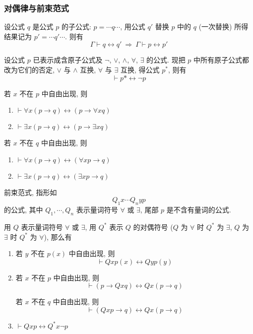 \documentclass[
    color=black,
    device=normal,
    lang=cn
]{elegantnote}
\begin{document}
\subsubsection{对偶律与前束范式}
\begin{theorem}[子公式的等价可替换性]
    设公式 $q$ 是公式 $p$ 的子公式: $p = \cdots q \cdots$, 用公式 $q'$ 替换 $p$ 中的 $q$ (一次替换) 所得结果记为 $p' = \cdots q'\cdots$. 则有
    $$
        \Gamma\vdash q\leftrightarrow q' \ \Rightarrow\  \Gamma\vdash p\leftrightarrow p'
    $$
\end{theorem}
\begin{theorem}[对偶律]
    设公式 $p$ 已表示成含原子公式及 $\lnot$, $\lor$, $\land$, $\forall$, $\exists$ 的公式. 现把 $p$ 中所有原子公式都改为它们的否定, $\lor$ 与 $\land$ 互换, $\forall$ 与 $\exists$ 互换, 得公式 $p^*$, 则有
    $$
        \vdash p*\leftrightarrow \lnot p
    $$
\end{theorem}
\begin{proposition}
    若 $x$ 不在 $p$ 中自由出现, 则
    \begin{enumerate}[label = $\arabic*^\circ$]
        \item $\vdash \forall x (p\to q)\leftrightarrow (p\to \forall x q)$
        \item $\vdash \exists x (p\to q)\leftrightarrow (p\to \exists x q)$
    \end{enumerate}
    若 $x$ 不在 $q$ 中自由出现, 则
    \begin{enumerate}[label = $\arabic*^\circ$]
        \item $\vdash \forall x (p\to q)\leftrightarrow (\forall x p\to q)$
        \item $\vdash \exists x (p\to q)\leftrightarrow (\exists x p\to q)$
    \end{enumerate}
\end{proposition}
\begin{definition}[前束范式]
    前束范式, 指形如
    $$
        Q_1 x\cdots Q_n y p
    $$
    的公式, 其中 $Q_1, \cdots, Q_n$ 表示量词符号 $\forall$ 或 $\exists$, 尾部 $p$ 是不含有量词的公式.
\end{definition}
\begin{proposition}
    用 $Q$ 表示量词符号 $\forall$ 或 $\exists$, 用 $Q^*$ 表示 $Q$ 的对偶符号 ($Q$ 为 $\forall$ 时 $Q^*$ 为 $\exists$, $Q$ 为 $\exists$ 时 $Q^*$ 为 $\forall$), 那么有
    \begin{enumerate}[label = $\arabic*^\circ$]
        \item 若 $y$ 不在 $p(x)$ 中自由出现, 则 $$\vdash Qxp(x)\leftrightarrow Qyp(y)$$
        \item 若 $x$ 不在 $p$ 中自由出现, 则 $$\vdash (p\to Qxq)\leftrightarrow Qx(p\to q)$$

              若 $x$ 不在 $q$ 中自由出现, 则 $$\vdash (Qxp\to q)\leftrightarrow Qx(p\to q)$$
        \item $\vdash Qxp\leftrightarrow Q^*x\lnot p$
    \end{enumerate}
\end{proposition}
\end{document}
